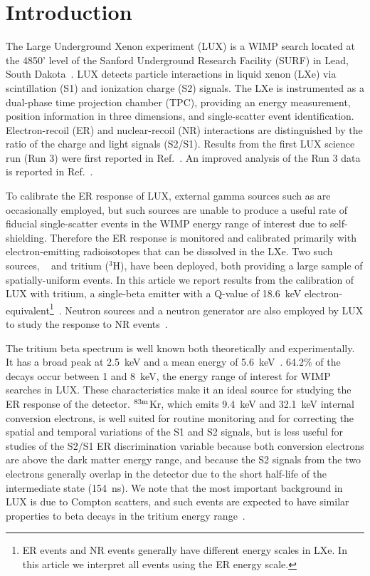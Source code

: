 \section{Introduction}

The Large Underground Xenon experiment (LUX) is a WIMP search located at the 4850' level of the Sanford Underground Research Facility (SURF) in Lead, South Dakota~\cite{lux-nim}. LUX detects particle interactions in liquid xenon (LXe) via scintillation (S1) and ionization charge (S2) signals. The LXe is instrumented as a dual-phase time projection chamber (TPC), providing an energy measurement, position information in three dimensions, and single-scatter event identification. Electron-recoil (ER) and nuclear-recoil (NR) interactions are distinguished by the ratio of the charge and light signals (S2/S1). Results from the first LUX science run (Run 3) were first reported in Ref.~\cite{lux-prl}. An improved analysis of the Run 3 data is reported in Ref.~\cite{lux-reanalysis}.

To calibrate the ER response of LUX, external gamma sources such as \cssrc are occasionally employed, but such sources are unable to produce a useful rate of fiducial single-scatter events in the WIMP energy range of interest due to self-shielding. Therefore the ER response is monitored and calibrated primarily with electron-emitting radioisotopes that can be dissolved in the LXe. Two such sources,  \krsrc~\cite{Kastens:2009pa, Baudis} and tritium ($^{3}$H), have been deployed, both providing a large sample of spatially-uniform events. In this article we report results from the calibration of LUX with tritium, a single-beta emitter with a Q-value of 18.6~keV electron-equivalent\footnote{ER events and NR events generally have different energy scales in LXe. In this article we interpret all events using the ER energy scale.}~\cite{Tritium_Q}. Neutron sources and a neutron generator are also employed by LUX to study the response to NR events~\cite{lux-reanalysis}.

The tritium beta spectrum is well known both theoretically and experimentally. It has a broad peak at 2.5~keV and a mean energy of 5.6~keV~\cite{Tritium_Mean,Tritium_Eq,Drexlin:2013lha}. 64.2\% of the decays occur between 1 and 8~keV, the energy range of interest for WIMP searches in LUX. These characteristics make it an ideal source for studying the ER response of the detector.  $\rm ^{83m}$Kr, which emits 9.4~keV and 32.1~keV internal conversion electrons, is well suited for routine monitoring and for correcting the spatial and temporal variations of the S1 and S2 signals, but is less useful for studies of the S2/S1 ER discrimination variable because both conversion electrons are above the dark matter energy range, and because the S2 signals from the two electrons generally overlap in the detector due to the short half-life of the intermediate state (154~ns). We note that the most important background in LUX is due to Compton scatters, and such events are expected to have similar properties to beta decays in the tritium energy range~\cite{NEST_2013}. 

